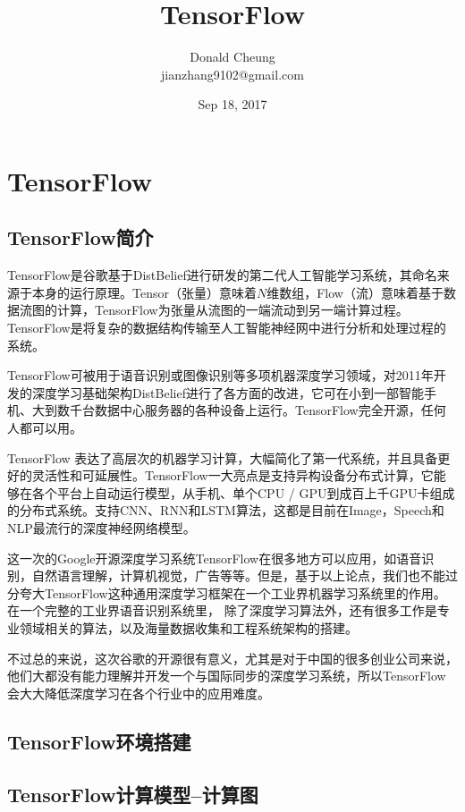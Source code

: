 \documentclass[10pt,a4paper]{ctexbook}
\begin{document}
    \setlength{\baselineskip}{20pt}
    \title{TensorFlow}
    \author{Donald Cheung\\jianzhang9102@gmail.com}
    \date{Sep 18, 2017}
    \tableofcontents
\fi

\chapter{TensorFlow}
\section{TensorFlow简介}
TensorFlow是谷歌基于DistBelief进行研发的第二代人工智能学习系统，其命名来源于本身的运行原理。Tensor（张量）意味着$N$维数组，Flow（流）意味着基于数据流图的计算，TensorFlow为张量从流图的一端流动到另一端计算过程。TensorFlow是将复杂的数据结构传输至人工智能神经网中进行分析和处理过程的系统。

TensorFlow可被用于语音识别或图像识别等多项机器深度学习领域，对2011年开发的深度学习基础架构DistBelief进行了各方面的改进，它可在小到一部智能手机、大到数千台数据中心服务器的各种设备上运行。TensorFlow完全开源，任何人都可以用。

TensorFlow 表达了高层次的机器学习计算，大幅简化了第一代系统，并且具备更好的灵活性和可延展性。TensorFlow一大亮点是支持异构设备分布式计算，它能够在各个平台上自动运行模型，从手机、单个CPU / GPU到成百上千GPU卡组成的分布式系统。支持CNN、RNN和LSTM算法，这都是目前在Image，Speech和NLP最流行的深度神经网络模型。

这一次的Google开源深度学习系统TensorFlow在很多地方可以应用，如语音识别，自然语言理解，计算机视觉，广告等等。但是，基于以上论点，我们也不能过分夸大TensorFlow这种通用深度学习框架在一个工业界机器学习系统里的作用。在一个完整的工业界语音识别系统里， 除了深度学习算法外，还有很多工作是专业领域相关的算法，以及海量数据收集和工程系统架构的搭建。

不过总的来说，这次谷歌的开源很有意义，尤其是对于中国的很多创业公司来说，他们大都没有能力理解并开发一个与国际同步的深度学习系统，所以TensorFlow会大大降低深度学习在各个行业中的应用难度。

\section{TensorFlow环境搭建}

\section{TensorFlow计算模型--计算图}
\end{document}
